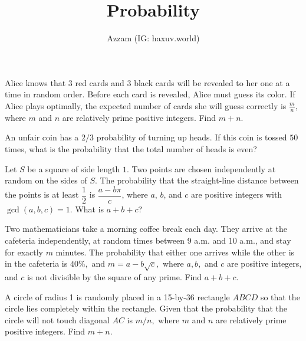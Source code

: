 \documentclass[12pt]{scrartcl}
\title{Probability}
\author{Azzam (IG: haxuv.world)}
\date{}
\begin{document}
\maketitle

\renewcommand*\contentsname{Daftar Isi}
\tableofcontents

\newpage

\begin{soaljawab} [AIME 2023]
    Alice knows that $3$ red cards and $3$ black cards will be revealed to her one at a time in random order. Before each card is revealed, Alice must guess its color. If Alice plays optimally, the expected number of cards she will guess correctly is $\frac{m}{n},$ where $m$ and $n$ are relatively prime positive integers. Find $m+n.$
\end{soaljawab}

\begin{soaljawab} [AHSME 1992]
    An unfair coin has a $2/3$ probability of turning up heads. If this coin is tossed $50$ times, what is the probability that the total number of heads is even?
\end{soaljawab}

\begin{soaljawab}[AMC 10 2015] 
    Let $S$ be a square of side length $1$. Two points are chosen independently at random on the sides of $S$. The probability that the straight-line distance between the points is at least $\dfrac{1}{2}$ is $\dfrac{a-b\pi}{c}$, where $a$, $b$, and $c$ are positive integers with $\gcd(a,b,c)=1$. What is $a+b+c$?
\end{soaljawab}

\begin{soaljawab} [AIME 1998]
    Two mathematicians take a morning coffee break each day. They arrive at the cafeteria independently, at random times between 9 a.m. and 10 a.m., and stay for exactly $m$ minutes. The probability that either one arrives while the other is in the cafeteria is $40 \%,$ and $m = a - b\sqrt {c},$ where $a, b,$ and $c$ are positive integers, and $c$ is not divisible by the square of any prime. Find $a + b + c.$
\end{soaljawab}

\begin{soaljawab} [AIME 2004]
    A circle of radius 1 is randomly placed in a 15-by-36 rectangle $ABCD$ so that the circle lies completely within the rectangle. Given that the probability that the circle will not touch diagonal $AC$ is $m/n,$ where $m$ and $n$ are relatively prime positive integers. Find $m + n.$
\end{soaljawab}
\end{document}
